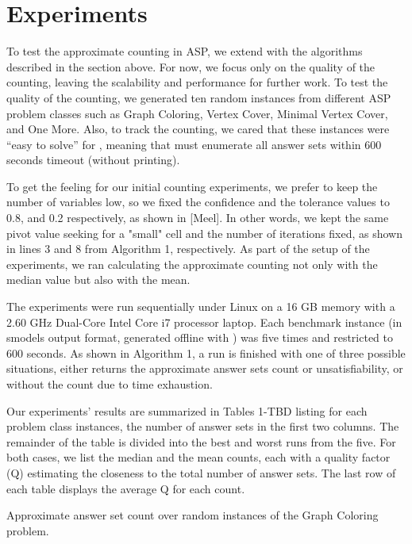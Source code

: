 \section{Experiments} \label{sec:experiments}

To test the approximate counting in ASP, we extend \xorro{} with the algorithms described in the section above.
For now, we focus only on the quality of the counting, leaving the scalability and performance for further work.
%
To test the quality of the counting,
we generated ten random instances from different ASP problem classes such as Graph Coloring, Vertex Cover, Minimal Vertex Cover, and One More.
Also, to track the counting, we cared that these instances were ``easy to solve'' for \clasp{},
meaning that \clasp{} must enumerate all answer sets within 600 seconds timeout (without printing).

To get the feeling for our initial counting experiments, we prefer to keep the number of variables low, so we fixed the confidence and the tolerance values to 0.8, and 0.2 respectively, as shown in [Meel].
In other words, we kept the same pivot value seeking for a "small" cell and the number of iterations fixed, as shown in lines 3 and 8 from Algorithm 1, respectively.
As part of the setup of the experiments, we ran \xorro{} calculating the approximate counting not only with the median value but also with the mean. 

The experiments were run sequentially under Linux on a 16 GB memory with a 2.60 GHz Dual-Core Intel Core i7 processor laptop.
Each benchmark instance (in smodels output format, generated offline with \gringo{}) was five times and restricted to 600 seconds.
As shown in Algorithm 1, a run is finished with one of three possible situations, either \xorro{} returns the approximate answer sets count or unsatisfiability, or without the count due to time exhaustion.

Our experiments' results are summarized in Tables 1-TBD listing for each problem class instances, the number of answer sets in the first two columns.
The remainder of the table is divided into the best and worst runs from the five. 
%
For both cases, we list the median and the mean counts, each with a quality factor (Q) estimating the closeness to the total number of answer sets.
The last row of each table displays the average Q for each count.

\begin{table*}[t]
  \centering
  
  \caption{Approximate answer set count over random instances of the Graph Coloring problem.}\label{table:graph_color}
\end{table*}


